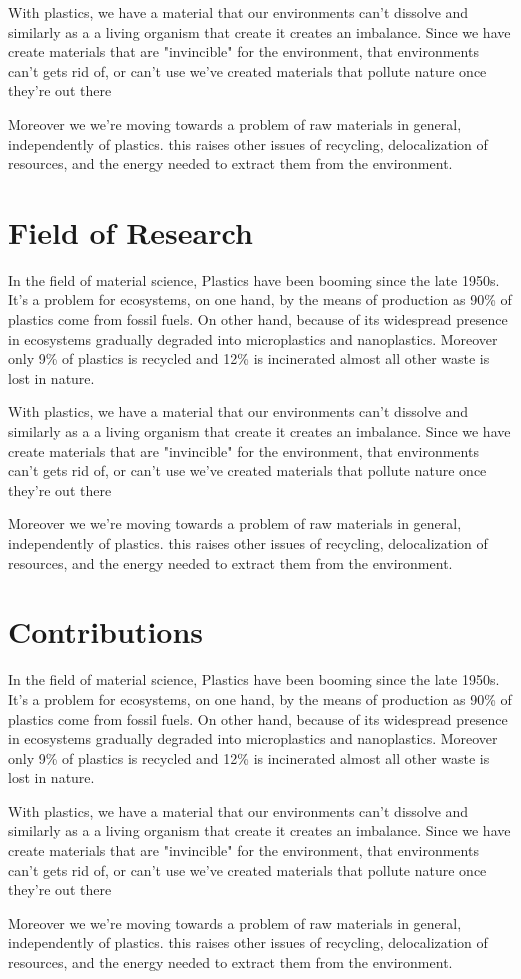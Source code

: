 With plastics, we have a material that our environments can't dissolve and similarly as a a living organism that create
it creates an imbalance. Since we have create materials that are "invincible" for the environment,  that environments can't gets rid of, or can't use
we've created materials that pollute nature once they're out there

Moreover we we're moving towards a problem of raw materials in general, independently of plastics. this raises other issues of recycling, 
delocalization of resources, and the energy needed to extract them from the environment.


\section{Field of Research}
In the field of material science, Plastics have been booming since the late 1950s\cite{geyer2017production}.
It's a problem for ecosystems, on one hand, by the means of production as 90\% of plastics come from fossil fuels. On other hand,
because of its widespread presence in ecosystems gradually degraded into microplastics and nanoplastics.
Moreover only 9\% of plastics is recycled and 12\% is incinerated almost all other waste is lost in nature\cite{natureeditorial}.

With plastics, we have a material that our environments can't dissolve and similarly as a a living organism that create
it creates an imbalance. Since we have create materials that are "invincible" for the environment,  that environments can't gets rid of, or can't use
we've created materials that pollute nature once they're out there

Moreover we we're moving towards a problem of raw materials in general, independently of plastics. this raises other issues of recycling, 
delocalization of resources, and the energy needed to extract them from the environment.

\section{Contributions}

In the field of material science, Plastics have been booming since the late 1950s\cite{geyer2017production}.
It's a problem for ecosystems, on one hand, by the means of production as 90\% of plastics come from fossil fuels. On other hand,
because of its widespread presence in ecosystems gradually degraded into microplastics and nanoplastics.
Moreover only 9\% of plastics is recycled and 12\% is incinerated almost all other waste is lost in nature\cite{natureeditorial}.

With plastics, we have a material that our environments can't dissolve and similarly as a a living organism that create
it creates an imbalance. Since we have create materials that are "invincible" for the environment,  that environments can't gets rid of, or can't use
we've created materials that pollute nature once they're out there

Moreover we we're moving towards a problem of raw materials in general, independently of plastics. this raises other issues of recycling, 
delocalization of resources, and the energy needed to extract them from the environment.
